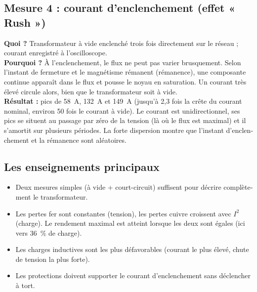 \documentclass[a4paper,11pt]{article}
\begin{document}
\begin{french}
\subsection{Mesure 4 : courant d'enclenchement (effet « Rush »)}
\textbf{Quoi ?} Transformateur à vide enclenché trois fois directement sur le réseau ; courant enregistré à l'oscilloscope.\\
\textbf{Pourquoi ?} À l'enclenchement, le flux ne peut pas varier brusquement. Selon l'instant de fermeture et le magnétisme rémanent (rémanence), une composante continue apparaît dans le flux et pousse le noyau en saturation. Un courant très élevé circule alors, bien que le transformateur soit à vide.\\
\textbf{Résultat :} pics de 58~A, 132~A et 149~A (jusqu'à 2,3 fois la crête du courant nominal, environ 50 fois le courant à vide). Le courant est unidirectionnel, ses pics se situent au passage par zéro de la tension (là où le flux est maximal) et il s'amortit sur plusieurs périodes. La forte dispersion montre que l'instant d'enclenchement et la rémanence sont aléatoires.

\subsection{Les enseignements principaux}
\begin{itemize}[nosep]
  \item Deux mesures simples (à vide + court-circuit) suffisent pour décrire complètement le transformateur.
  \item Les pertes fer sont constantes (tension), les pertes cuivre croissent avec $I^2$ (charge). Le rendement maximal est atteint lorsque les deux sont égales (ici vers 36~\% de charge).
  \item Les charges inductives sont les plus défavorables (courant le plus élevé, chute de tension la plus forte).
  \item Les protections doivent supporter le courant d'enclenchement sans déclencher à tort.
\end{itemize}
\end{french}
\end{document}
